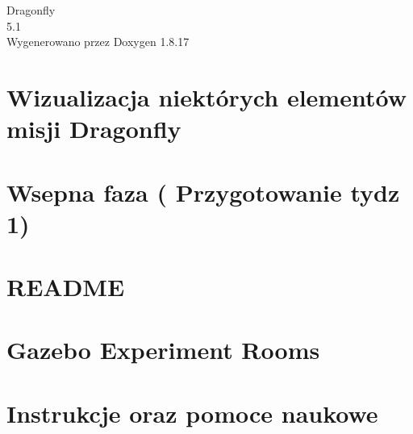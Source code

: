\let\mypdfximage\pdfximage\def\pdfximage{\immediate\mypdfximage}\documentclass[twoside]{book}
\newcommand{\+}{\discretionary{\mbox{\scriptsize$\hookleftarrow$}}{}{}}
\newcommand{\clearemptydoublepage}{%
  \newpage{\pagestyle{empty}\cleardoublepage}%
}
\begin{document}
\hypersetup{pageanchor=false,
             bookmarksnumbered=true,
             pdfencoding=unicode
            }
\begin{titlepage}
\vspace*{7cm}
\begin{center}%
{\Large Dragonfly \\[1ex]\large 5.\+1 }\\
\vspace*{1cm}
{\large Wygenerowano przez Doxygen 1.8.17}\\
\end{center}
\end{titlepage}
\clearemptydoublepage
{}
\tableofcontents
\clearemptydoublepage
{}
\hypersetup{pageanchor=true}

\chapter{Wizualizacja niektórych elementów misji Dragonfly}
\label{index}\hypertarget{index}{}
\chapter{Wsepna faza ( Przygotowanie tydz 1)}
\label{md__r_e_a_d_m_e}

\chapter{R\+E\+A\+D\+ME}
\label{md_tests_bin_queue_8pyi_models_piston_rod_part_ariac__r_e_a_d_m_e}

\chapter{Gazebo Experiment Rooms}
\label{md_tests_doctest_extensions_synchronize_8pyi__r_e_a_d_m_e}

\chapter{Instrukcje oraz pomoce naukowe}
\label{md_tests_doctest_translation_8pyi_social-tracking-protection-linkedin-digest256_8vlpset__r_e_a_d_m_e}

\end{document}
